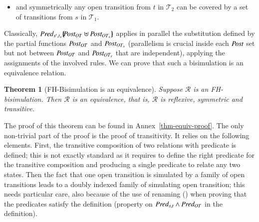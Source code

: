 \documentclass{elsarticle}
\newcommand{\TODO}[1]{\textcolor{red}{\textbf{[TODO:#1]}}}
\newtheorem{thm}{Theorem}
\begin{document}
\begin{definition}
\begin{itemize}
     
 \item  and symmetrically any open transition from $t$ in $\mathcal{T}_2$ can be 
      covered by a set of transitions from $s$ in $\mathcal{T}_1$.
 \end{itemize}

 

 \end{definition}
Classically, $\Pred_{s',t_x}\subst{\Post_{OT}\uplus\Post_{OT_x}}$
applies in parallel the  
substitution defined by the partial functions $\Post_{OT}$ and $\Post_{OT_x}$ (parallelism is crucial
inside each $\Post$ set but not between  $\Post_{OT}$ and
$\Post_{OT_x}$ that are independent), applying the assignments of the involved rules.
We can prove that such a bisimulation is an equivalence relation.




\begin{thm}[FH-Bisimulation is an equivalence]\label{thm-equiv} Suppose $\mathcal{R}$ 
is an FH-bisimulation. Then $\mathcal{R}$ is an equivalence, that is, $\mathcal{R}$ is 
reflexive, symmetric and transitive.
\end{thm}

The proof of this theorem can be found in Annex~\ref{thm-equiv-proof}. The
only non-trivial part of the proof is the proof of transitivity. It
relies on the following elements. First,  the transitive composition
of two relations with predicate is defined; this is not exactly
standard as it requires to define the right predicate for the
transitive composition and producing a single predicate to relate any
two states. Then the fact that one open transition is simulated by a
family of open transitions leads to a doubly indexed family of
simulating open transition; this needs particular care, also because
of the use of renaming (\Post) when proving that the predicates
satisfy the definition (property on $\Pred_{s,t} \land \Pred_{OT}$ in
the definition).  


\medskip
\end{document}
